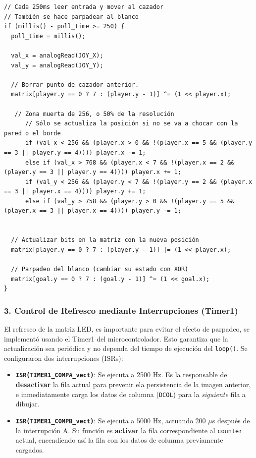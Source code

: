     \begin{verbatim}
// Cada 250ms leer entrada y mover al cazador
// También se hace parpadear al blanco
if (millis() - poll_time >= 250) {
  poll_time = millis();

  val_x = analogRead(JOY_X);
  val_y = analogRead(JOY_Y);

  // Borrar punto de cazador anterior.
  matrix[player.y == 0 ? 7 : (player.y - 1)] ^= (1 << player.x);

   // Zona muerta de 256, o 50% de la resolución
      // Sólo se actualiza la posición si no se va a chocar con la pared o el borde
      if (val_x < 256 && (player.x > 0 && !(player.x == 5 && (player.y == 3 || player.y == 4)))) player.x -= 1;
      else if (val_x > 768 && (player.x < 7 && !(player.x == 2 && (player.y == 3 || player.y == 4)))) player.x += 1;
      if (val_y < 256 && (player.y < 7 && !(player.y == 2 && (player.x == 3 || player.x == 4)))) player.y += 1;
      else if (val_y > 758 && (player.y > 0 && !(player.y == 5 && (player.x == 3 || player.x == 4)))) player.y -= 1;


  // Actualizar bits en la matriz con la nueva posición
  matrix[player.y == 0 ? 7 : (player.y - 1)] |= (1 << player.x);

  // Parpadeo del blanco (cambiar su estado con XOR)
  matrix[goal.y == 0 ? 7 : (goal.y - 1)] ^= (1 << goal.x);
}
\end{verbatim}


     

\subsubsection*{3. Control de Refresco mediante Interrupciones (Timer1)}

El refresco de la matriz LED, es importante para evitar el efecto de parpadeo, se implementó usando el Timer1 del microcontrolador. Esto garantiza que la actualización sea periódica y no dependa del tiempo de ejecución del \texttt{loop()}. Se configuraron dos interrupciones (ISRs):

\begin{itemize}
    \item \textbf{\texttt{ISR(TIMER1\_COMPA\_vect)}}: Se ejecuta a 2500 Hz. Es la responsable de \textbf{desactivar} la fila actual para prevenir ela persistencia de la imagen anterior, e inmediatamente carga los datos de columna (\texttt{DCOL}) para la \textit{siguiente} fila a dibujar.

    \item \textbf{\texttt{ISR(TIMER1\_COMPB\_vect)}}: Se ejecuta a 5000 Hz, actuando 200 $\mu$s después de la interrupción A. Su función es \textbf{activar} la fila correspondiente al \texttt{counter} actual, encendiendo así la fila con los datos de columna previamente cargados.
\end{itemize}


